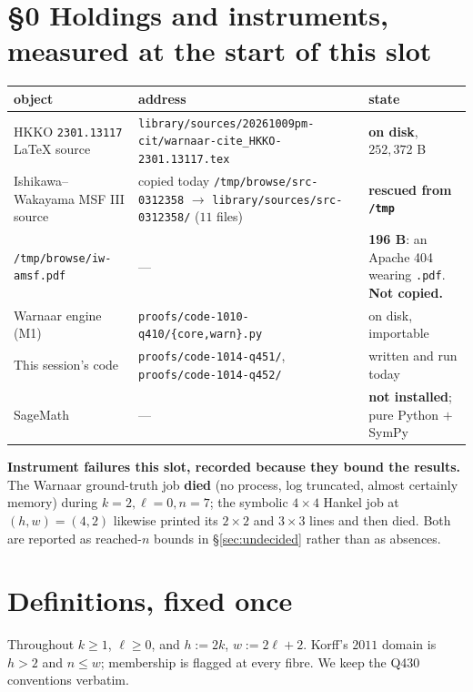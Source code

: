 \documentclass[11pt]{article}
\theoremstyle{plain}
\theoremstyle{definition}
\theoremstyle{remark}
\begin{document}
\section*{\S0 Holdings and instruments, measured at the start of this slot}

\begin{center}\small
\begin{tabular}{@{}p{}p{}p{}@{}}
\toprule
\textbf{object} & \textbf{address} & \textbf{state}\\
\midrule
HKKO \texttt{2301.13117} \LaTeX{} source & \texttt{library/sources/20261009pm-cit/warnaar-cite\_HKKO-2301.13117.tex} & \textbf{on disk}, $252{,}372$ B\\
Ishikawa--Wakayama MSF III source & copied today \texttt{/tmp/browse/src-0312358} $\to$ \texttt{library/sources/src-0312358/} ($11$ files) & \textbf{rescued from \texttt{/tmp}}\\
\texttt{/tmp/browse/iw-amsf.pdf} & --- & \textbf{196 B}: an Apache 404 wearing \texttt{.pdf}. \textbf{Not copied.}\\
Warnaar engine (M1) & \texttt{proofs/code-1010-q410/\{core,warn\}.py} & on disk, importable\\
This session's code & \texttt{proofs/code-1014-q451/}, \texttt{proofs/code-1014-q452/} & written and run today\\
SageMath & --- & \textbf{not installed}; pure Python $+$ SymPy\\
\bottomrule
\end{tabular}
\end{center}

\noindent\textbf{Instrument failures this slot, recorded because they bound the results.}
The Warnaar ground-truth job \textbf{died} (no process, log truncated, almost certainly memory)
during $k=2,\ell=0,n=7$; the symbolic $4\times4$ Hankel job at $(h,w)=(4,2)$ likewise printed
its $2\times2$ and $3\times3$ lines and then died. Both are reported as reached-$n$ bounds in
\S\ref{sec:undecided} rather than as absences.

\section{Definitions, fixed once}

Throughout $k\ge1$, $\ell\ge0$, and $h:=2k$, $w:=2\ell+2$. Korff's $2011$ domain is $h>2$ and
$n\le w$; membership is flagged at every fibre. We keep the Q430 conventions verbatim.
\end{document}
